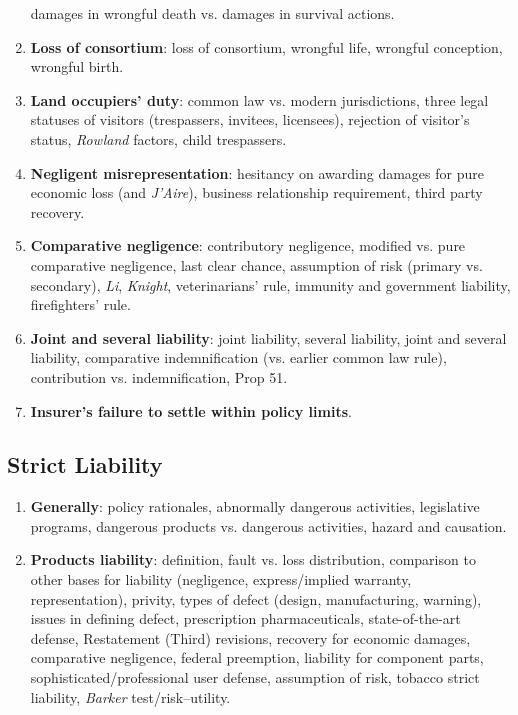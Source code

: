 \begin{enumerate}
    damages in wrongful death vs. damages in survival actions.
    \item \textbf{Loss of consortium}: loss of consortium, wrongful life, 
    wrongful conception, wrongful birth.
    \item \textbf{Land occupiers' duty}: common law vs. modern jurisdictions, 
    three legal statuses of visitors (trespassers, invitees, licensees), 
    rejection of visitor's status, \emph{Rowland} factors, child trespassers.
    \item \textbf{Negligent misrepresentation}: hesitancy on awarding damages 
    for pure economic loss (and \emph{J'Aire}), business relationship 
    requirement, third party recovery.
    \item \textbf{Comparative negligence}: contributory negligence, modified 
    vs. pure comparative negligence, last clear chance, assumption of risk 
    (primary vs. secondary), \emph{Li}, \emph{Knight}, veterinarians' rule, 
    immunity and government liability, firefighters' rule.
    \item \textbf{Joint and several liability}: joint liability, several 
    liability, joint and several liability, comparative indemnification (vs. 
    earlier common law rule), contribution vs. indemnification, Prop 51.
    \item \textbf{Insurer's failure to settle within policy limits}.
\end{enumerate}

\subsection{Strict Liability}

\begin{enumerate}
    \item \textbf{Generally}: policy rationales, abnormally dangerous activities, 
    legislative programs, dangerous products vs. dangerous activities, hazard 
    and causation.
    \item \textbf{Products liability}: definition, fault vs. loss 
    distribution, comparison to other bases for liability (negligence, 
    express/implied warranty, representation), privity, types of defect 
    (design, manufacturing, warning), issues in defining defect, prescription 
    pharmaceuticals, state-of-the-art defense, Restatement (Third) revisions, 
    recovery for economic damages, comparative negligence, federal preemption, 
    liability for component parts, sophisticated/professional user defense, 
    assumption of risk, tobacco strict liability, \emph{Barker} 
    test/risk--utility.
\end{enumerate}

